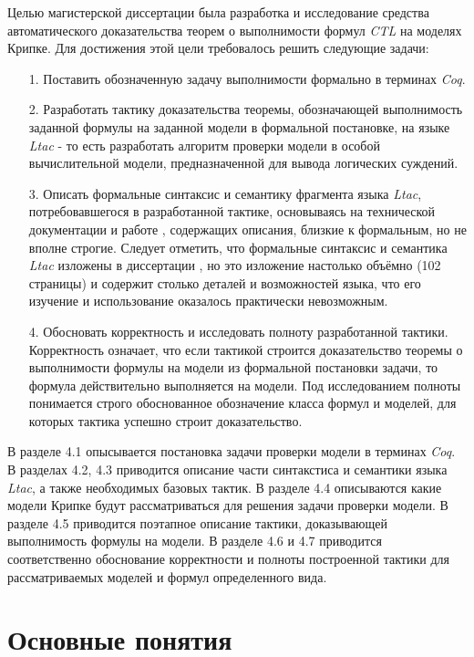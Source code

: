 \documentclass[12pt]{article}
\begin{document}
Целью магистерской диссертации была разработка и исследование средства автоматического доказательства теорем о выполнимости формул \textit{CTL} на моделях Крипке.
Для достижения этой цели требовалось решить следующие задачи:
\begin{enumerate}
    \item[1.] Поставить обозначенную задачу выполнимости формально в терминах \textit{Coq}.
    \item[2.] Разработать тактику доказательства теоремы, обозначающей выполнимость заданной формулы на заданной модели в формальной постановке, на языке \textit{Ltac} - то есть разработать алгоритм проверки модели в особой вычислительной модели, предназначенной для вывода логических суждений.
    \item[3.] Описать формальные синтаксис и семантику фрагмента языка \textit{Ltac}, потребовавшегося в разработанной тактике, основываясь на технической документации \cite{Ltac} и работе \cite{LtacRef}, содержащих описания, близкие к формальным, но не вполне строгие. Следует отметить, что формальные синтаксис и семантика \textit{Ltac} изложены в диссертации \cite{LtacFull}, но это изложение настолько объёмно (102 страницы) и содержит столько деталей и возможностей языка, что его изучение и использование оказалось практически невозможным.
    \item[4.] Обосновать корректность и исследовать полноту разработанной тактики. Корректность означает, что если тактикой строится доказательство теоремы о выполнимости формулы на модели из формальной постановки задачи, то формула действительно выполняется на модели. Под исследованием полноты понимается строго обоснованное обозначение класса формул и моделей, для которых тактика успешно строит доказательство.
\end{enumerate}

В разделе 4.1 опысывается постановка задачи проверки модели в терминах \textit{Coq}. В разделах 4.2, 4.3 приводится описание части синтакстиса и семантики языка \textit{Ltac}, а также необходимых базовых тактик. В разделе 4.4 описываются какие модели Крипке будут рассматриваться для решения задачи проверки модели. В разделе 4.5 приводится поэтапное описание тактики, доказывающей выполнимость формулы на модели. В разделе 4.6 и 4.7 приводится соответственно обоснование корректности и полноты построенной тактики для рассматриваемых моделей и формул определенного вида.



\section{Основные понятия}
\end{document}
